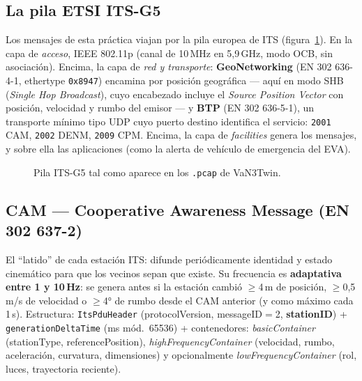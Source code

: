 \documentclass[11pt,a4paper]{article}
\begin{document}
\subsection{La pila ETSI ITS-G5}

Los mensajes de esta práctica viajan por la pila europea de ITS
(figura~\ref{fig:pila}). En la capa de \emph{acceso}, IEEE 802.11p (canal de
10\,MHz en 5,9\,GHz, modo OCB, sin asociación). Encima, la capa de
\emph{red y transporte}: \textbf{GeoNetworking} (EN 302 636-4-1, ethertype
\texttt{0x8947}) encamina por posición geográfica --- aquí en modo SHB
(\emph{Single Hop Broadcast}), cuyo encabezado incluye el \emph{Source
Position Vector} con posición, velocidad y rumbo del emisor --- y
\textbf{BTP} (EN 302 636-5-1), un transporte mínimo tipo UDP cuyo puerto
destino identifica el servicio: \texttt{2001} CAM, \texttt{2002} DENM,
\texttt{2009} CPM. Encima, la capa de \emph{facilities} genera los mensajes,
y sobre ella las aplicaciones (como la alerta de vehículo de emergencia del
EVA).

\begin{figure}[h!]
\centering
{}
\caption{Pila ITS-G5 tal como aparece en los \texttt{.pcap} de VaN3Twin.}
\label{fig:pila}
\end{figure}

\subsection{CAM --- Cooperative Awareness Message (EN 302 637-2)}

El ``latido'' de cada estación ITS: difunde periódicamente identidad y estado
cinemático para que los vecinos sepan que existe. Su frecuencia es
\textbf{adaptativa entre 1 y 10\,Hz}: se genera antes si la estación cambió
$\geq$4\,m de posición, $\geq$0,5\,m/s de velocidad o $\geq$4° de rumbo desde
el CAM anterior (y como máximo cada 1\,s). Estructura: \texttt{ItsPduHeader}
(protocolVersion, messageID$=$2, \textbf{stationID}) +
\texttt{generationDeltaTime} (ms mód.\ 65536) + contenedores:
\emph{basicContainer} (stationType, referencePosition),
\emph{highFrequencyContainer} (velocidad, rumbo, aceleración, curvatura,
dimensiones) y opcionalmente \emph{lowFrequencyContainer} (rol, luces,
trayectoria reciente).
\end{document}
